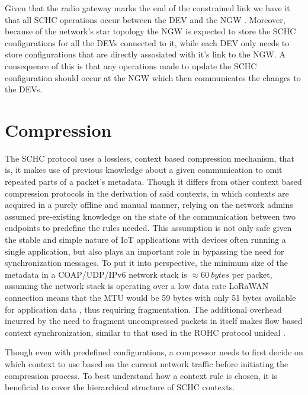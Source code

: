 \documentclass[12pt]{dalthesis}
\begin{document}
	\par{
		Given that the radio gateway marks the end of the constrained link we have it that all SCHC operations occur between the DEV and the NGW \cite{rfc9011, rfc8724}.
		Moreover, because of the network's star topology 
		the NGW is expected to store the SCHC configurations for all the DEVs connected to it,
		while each DEV only needs to store configurations that are directly assosiated with it's link to the NGW. A consequence of this 
		is that any operations made to update the SCHC configuration should occur at the NGW which then communicates the changes
		to the DEVs.
	}

\section{Compression}
	

	\par{
		The SCHC protocol uses a lossless, context based compression mechanism, that is, it makes use of previous knowledge
		about a given communication to omit repeated parts of a packet's metadata. Though it
		differs from other context based compression protocols in the derivation of said contexts,
		in which contexts are acquired in a purely offline and manual manner, relying on the network admins assumed
		pre-existing knowledge on the state of the communication between two endpoints to predefine the rules needed.
		This assumption is not only safe given the stable and simple nature of IoT applications with devices often running a single application, but
		also plays an important role in bypassing the need for synchronization messages. To put it into perspective, the minimum size of the metadata in a 
		COAP/UDP/IPv6 network stack is $\approx 60 \ bytes$ per packet, assuming the network stack is operating over a low data rate
		LoRaWAN connection
		means that the MTU would be 59 bytes with only 51 bytes available for application data \cite{lora_regional_params_2016},
		thus requiring fragmentation. 
		The additional overhead incurred by the need to fragment uncompressed packets in itself makes flow based context synchronization, similar to that used in the ROHC protocol unideal \cite{GomezMontenegro2020IPv6}.
	}

	\vspace{5pt}
	\par{
		Though even with predefined configurations, a compressor needs to first decide on which context to use based on the current network traffic before initiating
		the compression process.
		To best understand how a context rule is chosen, it is beneficial to cover the hierarchical structure of SCHC contexts.
	}
\end{document}
